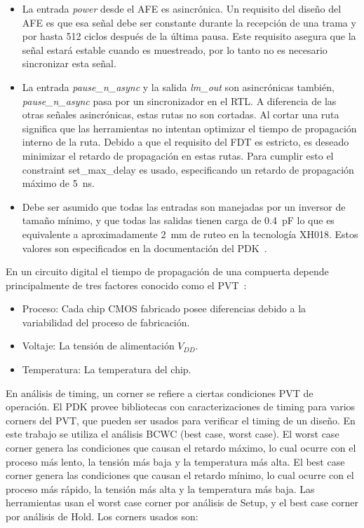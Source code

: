 \documentclass[a4paper, twoside, 11pt]{report}
\begin{document}
\begin{itemize}
  \item La entrada \textit{power} desde el AFE es asincrónica. Un requisito del diseño del AFE es que esa señal debe ser constante durante la recepción de una trama y por hasta 512 ciclos después de la última pausa. Este requisito asegura que la señal estará estable cuando es muestreado, por lo tanto no es necesario sincronizar esta señal.
  \item La entrada \textit{pause\_n\_async} y la salida \textit{lm\_out} son asincrónicas también, \textit{pause\_n\_async} pasa por un sincronizador en el RTL. A diferencia de las otras señales asincrónicas, estas rutas no son cortadas. Al cortar una ruta significa que las herramientas no intentan optimizar el tiempo de propagación interno de la ruta. Debido a que el requisito del FDT es estricto, es deseado minimizar el retardo de propagación en estas rutas. Para cumplir esto el constraint set\_max\_delay es usado, especificando un retardo de propagación máximo de \SI{5}{\nano\second}.
  \item Debe ser asumido que todas las entradas son manejadas por un inversor de tamaño mínimo, y que todas las salidas tienen carga de \SI{0.4}{\pico\farad} lo que es equivalente a aproximadamente \SI{2}{\milli\meter} de ruteo en la tecnología XH018. Estos valores son especificados en la documentación del PDK~\cite{dig_imp_guidelines}.
\end{itemize}

En un circuito digital el tiempo de propagación de una compuerta depende principalmente de tres factores conocido como el PVT~\cite{sta_for_nm_designs}:

\begin{itemize}
  \item Proceso: Cada chip CMOS fabricado posee diferencias debido a la variabilidad del proceso de fabricación.
  \item Voltaje: La tensión de alimentación $V_{DD}$.
  \item Temperatura: La temperatura del chip.
\end{itemize}

En análisis de timing, un corner se refiere a ciertas condiciones PVT de operación. El PDK provee bibliotecas con caracterizaciones de timing para varios corners del PVT, que pueden ser usados para verificar el timing de un diseño. En este trabajo se utiliza el análisis BCWC (best case, worst case). El worst case corner genera las condiciones que causan el retardo máximo, lo cual ocurre con el proceso más lento, la tensión más baja y la temperatura más alta. El best case corner genera las condiciones que causan el retardo mínimo, lo cual ocurre con el proceso más rápido, la tensión más alta y la temperatura más baja. Las herramientas usan el worst case corner por análisis de Setup, y el best case corner por análisis de Hold. Los corners usados son:
\end{document}
